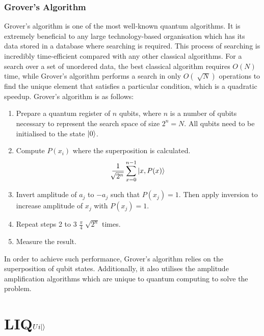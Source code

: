 \documentclass[12pt]{third-rep}
\begin{document}
\subsection{Grover's Algorithm}
Grover's algorithm is one of the most well-known quantum algorithms. It is extremely beneficial to any large technology-based organisation which has its data stored in a database where searching is required. This process of searching is incredibly time-efficient compared with any other classical algorithms. For a search over a set of unordered data, the best classical algorithm requires $O(N)$ time, while Grover's algorithm performs a search in only $O(\sqrt[]{N})$ operations to find the unique element that satisfies a particular condition, which is a quadratic speedup. Grover's algorithm is as follows:
\begin{enumerate}
\item Prepare a quantum register of $n$ qubits, where $n$ is a number of qubits necessary to represent the search space of size $2^n=N$. All qubits need to be initialised to the state ${\left\vert{0}\right\rangle}$.
\item Compute $P(x_i)$ where the superposition is calculated.
$$\frac{1}{\sqrt[]{2^n}}\sum_{x=0}^{n-1}{\left\vert{x,P(x)}\right\rangle}$$
\item Invert amplitude of $a_j$ to $-a_j$ such that $P(x_j)=1$. Then apply inversion to increase amplitude of $x_j$ with $P(x_j)=1$.
\item Repeat steps 2 to 3 $\frac{\pi}{4}\sqrt[]{2^n}$ times.
\item Measure the result.
\end{enumerate}
In order to achieve such performance, Grover's algorithm relies on the superposition of qubit states. Additionally, it also utilises the amplitude amplification algorithms which are unique to quantum computing to solve the problem.

\chapter{LIQ$Ui{\left\vert{}\right\rangle}$}
\end{document}
